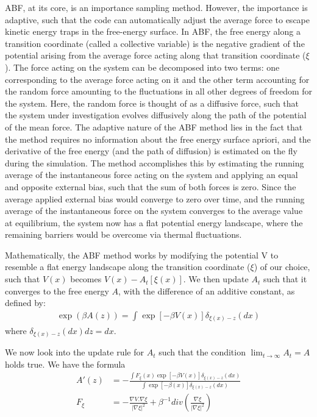ABF, at its core, is an importance sampling method\supercite{comer_adaptive_2015}. However, the importance is adaptive, such that the code can automatically adjust the average force to escape kinetic energy traps in the free-energy surface. In ABF, the free energy along a transition coordinate (called a collective variable) is the negative gradient of the potential arising from the average force acting along that transition coordinate ($\xi$). The force acting on the system can be decomposed into two terms: one corresponding to the average force acting on it and the other term accounting for the random force amounting to the fluctuations in all other degrees of freedom for the system. Here, the random force is thought of as a diffusive force, such that the system under investigation evolves diffusively along the path of the potential of the mean force. The adaptive nature of the ABF method lies in the fact that the method requires no information about the free energy surface apriori, and the derivative of the free energy (and the path of diffusion) is estimated on the fly during the simulation. The method accomplishes this by estimating the running average of the instantaneous force acting on the system and applying an equal and opposite external bias, such that the sum of both forces is zero. Since the average applied external bias would converge to zero over time, and the running average of the instantaneous force on the system converges to the average value at equilibrium, the system now has a flat potential energy landscape, where the remaining barriers would be overcome via thermal fluctuations.

Mathematically, the ABF method works by modifying the potential V to resemble a flat energy landscape along the transition coordinate ($\xi$) of our choice, such that $V(x)$ becomes $V(x) - A_t[\xi(x)]$. We then update $A_t$ such that it converges to the free energy $A$, with the difference of an additive constant, as defined by:
\begin{align*}
    \exp(\beta A(z)) = \int_{}^{}\exp\left[-\beta V(x)\right]\delta_{\xi(x)-z}(dx)
\end{align*}
where $\delta_{\xi(x)-z}(dx)dz = dx$.

We now look into the update rule for $A_t$ such that the condition $\lim_{t\to\infty} A_t = A$ holds true. We have the formula
\begin{align*}
    A'(z) &= -\frac{\int F_{\xi}(x)\exp\left[-\beta V(x)\right]\delta_{\xi(x)-z}(dx)}{\int\exp\left[-\beta (x)\right]\delta_{\xi(x)-z}(dx)} \\
    F_\xi &= -\frac{\nabla V.\nabla\xi}{\left| \nabla\xi \right|^2} + \beta^{-1} div\left(\frac{\nabla\xi}{\left| \nabla\xi \right|^2}\right)
\end{align*}

